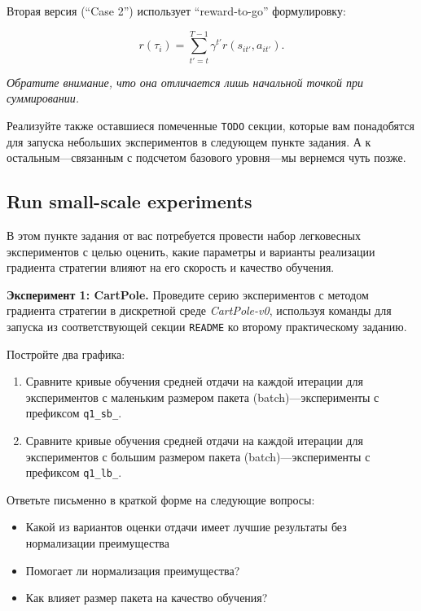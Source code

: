 \documentclass[12pt, oneside]{article}
\begin{document}
\noindent
Вторая версия (``Case 2'') использует ``reward-to-go'' формулировку:

\begin{equation}
    r(\tau_i) = \sum_{t' = t}^{T - 1} {\gamma^{t'} r(s_{it'}, a_{it'})}.
\end{equation}

\noindent
\textit{Обратите внимание, что она отличается лишь начальной точкой при суммировании.}

Реализуйте также оставшиеся помеченные \verb|TODO| секции, которые вам понадобятся для запуска небольших экспериментов в следующем пункте задания. А к остальным---связанным с подсчетом базового уровня---мы вернемся чуть позже.

\subsection{Run small-scale experiments}

В этом пункте задания от вас потребуется провести набор легковесных экспериментов с целью оценить, какие параметры и варианты реализации градиента стратегии влияют на его скорость и качество обучения.

\textbf{Эксперимент 1: CartPole.} Проведите серию экспериментов с методом градиента стратегии в дискретной среде \textit{CartPole-v0}, используя команды для запуска из соответствующей секции \verb|README| ко второму практическому заданию.

Постройте два графика:

\begin{enumerate}
    \item Сравните кривые обучения средней отдачи на каждой итерации для экспериментов с маленьким размером пакета (batch)---эксперименты с префиксом \verb|q1_sb_|.
    \item Сравните кривые обучения средней отдачи на каждой итерации для экспериментов с большим размером пакета (batch)---эксперименты с префиксом \verb|q1_lb_|.
\end{enumerate}

Ответьте письменно в краткой форме на следующие вопросы:

\begin{itemize}
    \item Какой из вариантов оценки отдачи имеет лучшие результаты без нормализации преимущества
    \item Помогает ли нормализация преимущества?
    \item Как влияет размер пакета на качество обучения?
\end{itemize}
\end{document}
